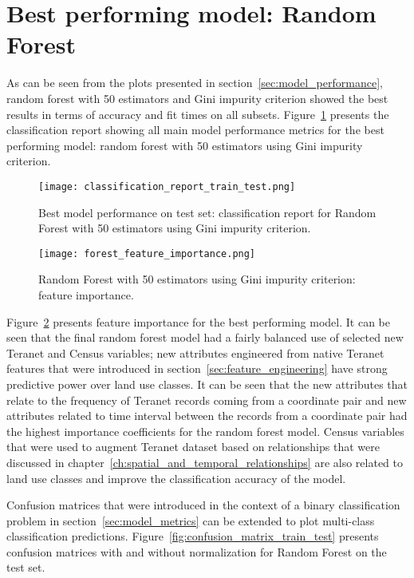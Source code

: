 \section{Best performing model: Random Forest} \label{sec:best_performing_model}

As can be seen from the plots presented in section~\ref{sec:model_performance}, random forest with 50 estimators and Gini impurity criterion showed the best results in terms of accuracy and fit times on all subsets.
Figure~\ref{fig:classification_report_train_test} presents the classification report showing all main model performance metrics for the best performing model: random forest with 50 estimators using Gini impurity criterion.

\begin{figure}[hbt!]
    \centering
    \texttt{[image: classification\_report\_train\_test.png]}
    \caption{Best model performance on test set: classification report for Random Forest with 50 estimators using Gini impurity criterion.}
    \label{fig:classification_report_train_test}
\end{figure}

\begin{figure}[hbt!]
    \centering
    \texttt{[image: forest\_feature\_importance.png]}
    \caption{Random Forest with 50 estimators using Gini impurity criterion: feature importance.}
    \label{fig:forest_feature_importance}
\end{figure}

Figure~\ref{fig:forest_feature_importance} presents feature importance for the best performing model.
It can be seen that the final random forest model had a fairly balanced use of selected new Teranet and Census variables;
new attributes engineered from native Teranet features that were introduced in section~\ref{sec:feature_engineering} have strong predictive power over land use classes.
It can be seen that the new attributes that relate to the frequency of Teranet records coming from a coordinate pair and new attributes related to time interval between the records from a coordinate pair had the highest importance coefficients for the random forest model.
Census variables that were used to augment Teranet dataset based on relationships that were discussed in chapter~\ref{ch:spatial_and_temporal_relationships} are also related to land use classes and improve the classification accuracy of the model.

Confusion matrices that were introduced in the context of a binary classification problem in section~\ref{sec:model_metrics} can be extended to plot multi-class classification predictions.
Figure~\ref{fig:confusion_matrix_train_test} presents confusion matrices with and without normalization for Random Forest on the test set.

